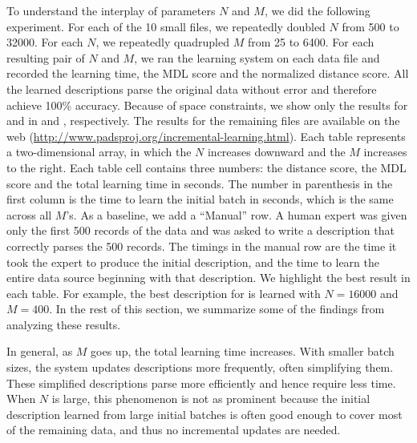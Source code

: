 To understand the interplay of parameters $N$ and $M$,
we did the following experiment. For each of the 10 small files,
we repeatedly doubled $N$ from 500 to 32000. 
For each $N$, we repeatedly quadrupled $M$ from 25 to 6400.  
For each resulting pair of $N$ and $M$, we ran the learning system on each data file and
recorded the learning time, the MDL score
and the normalized distance score. 
All the learned descriptions parse the original data
without error and therefore achieve 100\% accuracy. 
Because of space constraints, we show only
the results for  and  in
 and , respectively.
The results for the remaining files are available on the web (\url{http://www.padsproj.org/incremental-learning.html}).
Each table represents a two-dimensional array, in which the $N$
increases downward and the $M$ increases to the right.
Each table cell contains three numbers: the distance score, the MDL score
and the total learning time in seconds. The number in parenthesis in the first column
is the time to learn the initial batch in seconds, which is the same across all
$M$'s. As a baseline, we add a ``Manual'' row. 
A human expert was given
only the first 500 records of the data and was asked to write a \pads{}
description that correctly parses the 500 records. The timings in the manual
row are the time it took the expert to produce the initial description, and the
time to learn the entire data source beginning with that description. 
We highlight the best result in each table. For example, the best description
for  is learned with $N=16000$ and $M=400$. 
In the rest of this section, we summarize some of the findings from analyzing these results.


In general, as $M$ goes up, the total learning time increases. 
With smaller batch sizes, the system updates descriptions 
more frequently, often simplifying them. These simplified descriptions 
parse more efficiently and
hence require less time. When $N$ is large, this phenomenon is not as prominent 
because the initial description learned from large
initial batches is often good enough to cover most of the remaining data,
and thus no incremental updates are needed.

